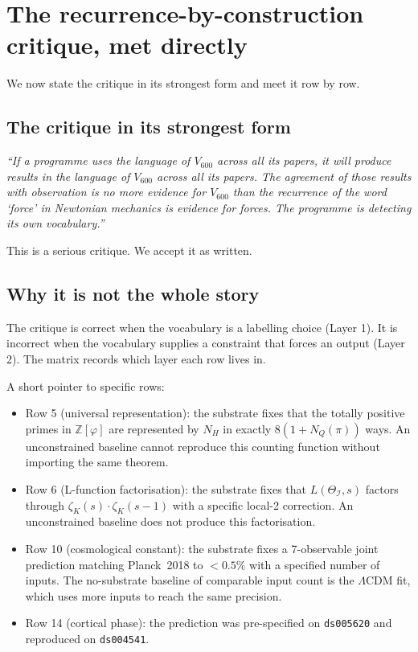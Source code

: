 \documentclass[11pt,a4paper]{article}
\newcommand{\II}{\mathcal{I}}
\newcommand{\Vsix}{V_{600}}
\newcommand{\NH}{N_H}
\newcommand{\Z}{\mathbb{Z}}
\begin{document}
\section{The recurrence-by-construction critique, met directly}
\label{sec:critique}

We now state the critique in its strongest form and meet it row by
row.

\subsection{The critique in its strongest form}

\emph{``If a programme uses the language of $\Vsix$ across all its
papers, it will produce results in the language of $\Vsix$ across
all its papers. The agreement of those results with observation is
no more evidence for $\Vsix$ than the recurrence of the word `force'
in Newtonian mechanics is evidence for forces. The programme is
detecting its own vocabulary.''}

This is a serious critique. We accept it as written.

\subsection{Why it is not the whole story}

The critique is correct when the vocabulary is a labelling choice
(Layer 1). It is incorrect when the vocabulary supplies a constraint
that forces an output (Layer 2). The matrix records which layer
each row lives in.

A short pointer to specific rows:
\begin{itemize}[leftmargin=*]
  \item Row 5 (universal representation): the substrate fixes that
        the totally positive primes in $\Z[\varphi]$ are represented
        by $\NH$ in exactly $8(1+N_Q(\pi))$ ways. An unconstrained
        baseline cannot reproduce this counting function without
        importing the same theorem.
  \item Row 6 (L-function factorisation): the substrate fixes that
        $L(\Theta_\II, s)$ factors through $\zeta_K(s) \cdot
        \zeta_K(s-1)$ with a specific local-2 correction. An
        unconstrained baseline does not produce this factorisation.
  \item Row 10 (cosmological constant): the substrate fixes a
        7-observable joint prediction matching Planck~2018 to
        $<0.5\%$ with a specified number of inputs. The
        no-substrate baseline of comparable input count is the
        $\Lambda$CDM fit, which uses more inputs to reach the same
        precision.
  \item Row 14 (cortical phase): the prediction was pre-specified
        on \texttt{ds005620} and reproduced on
        \texttt{ds004541}.
\end{itemize}
\end{document}
